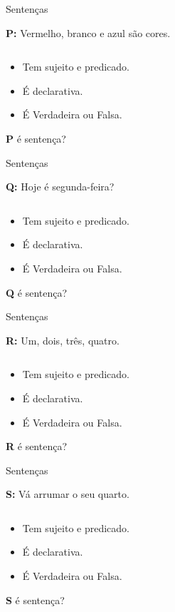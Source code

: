 \documentclass[10pt]{beamer}
\theoremstyle{plain}
\begin{document}
\begin{frame}{Sentenças}
    \begin{block}{}
     \textbf{P:} Vermelho, branco e azul são cores.
    \end{block}
    $ $
\begin{itemize}
    \item Tem sujeito e predicado.
    \item É declarativa.
    \item É Verdadeira ou Falsa.
\end{itemize}
$$$$
\textbf{P} é sentença?
\end{frame}

\begin{frame}{Sentenças}
    \begin{block}{}
     \textbf{Q:} Hoje é segunda-feira?
    \end{block}
    $ $
\begin{itemize}
    \item Tem sujeito e predicado.
    \item É declarativa.
    \item É Verdadeira ou Falsa.
\end{itemize}
$$$$
\textbf{Q} é sentença?
\end{frame}

\begin{frame}{Sentenças}
    \begin{block}{}
     \textbf{R:} Um, dois, três, quatro.
    \end{block}
    $ $
\begin{itemize}
    \item Tem sujeito e predicado.
    \item É declarativa.
    \item É Verdadeira ou Falsa.
\end{itemize}
$$$$
\textbf{R} é sentença?
\end{frame}

\begin{frame}{Sentenças}
    \begin{block}{}
     \textbf{S:} Vá arrumar o seu quarto.
    \end{block}
    $ $
\begin{itemize}
    \item Tem sujeito e predicado.
    \item É declarativa.
    \item É Verdadeira ou Falsa.
\end{itemize}
$$$$
\textbf{S} é sentença?
\end{frame}
\end{document}

